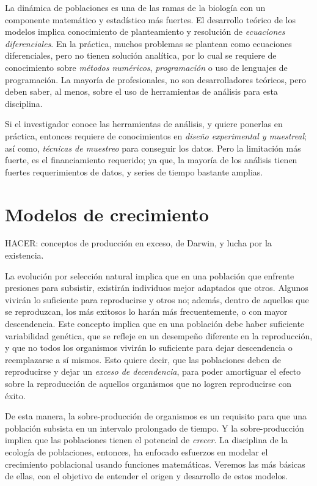 \documentclass[12pt,letterpaper,]{book}
\begin{document}
La dinámica de poblaciones es una de las ramas de la biología con un
componente matemático y estadístico más fuertes. El desarrollo teórico
de los modelos implica conocimiento de planteamiento y resolución de
\emph{ecuaciones diferenciales}. En la práctica, muchos problemas se
plantean como ecuaciones diferenciales, pero no tienen solución
analítica, por lo cual se requiere de conocimiento sobre \emph{métodos
numéricos}, \emph{programación} o uso de lenguajes de programación. La
mayoría de profesionales, no son desarrolladores teóricos, pero deben
saber, al menos, sobre el uso de herramientas de análisis para esta
disciplina.

Si el investigador conoce las herramientas de análisis, y quiere
ponerlas en práctica, entonces requiere de conocimientos en \emph{diseño
experimental y muestreal}; así como, \emph{técnicas de muestreo} para
conseguir los datos. Pero la limitación más fuerte, es el financiamiento
requerido; ya que, la mayoría de los análisis tienen fuertes
requerimientos de datos, y series de tiempo bastante amplias.

\chapter{Modelos de crecimiento}\label{modelos-de-crecimiento}

HACER: conceptos de producción en exceso, de Darwin, y lucha por la
existencia.

La evolución por selección natural implica que en una población que
enfrente presiones para subsistir, existirán individuos mejor adaptados
que otros. Algunos vivirán lo suficiente para reproducirse y otros no;
además, dentro de aquellos que se reproduzcan, los más exitosos lo harán
más frecuentemente, o con mayor descendencia. Este concepto implica que
en una población debe haber suficiente variabilidad genética, que se
refleje en un desempeño diferente en la reproducción, y que no todos los
organismos vivirán lo suficiente para dejar descendencia o reemplazarse
a sí mismos. Esto quiere decir, que las poblaciones deben de
reproducirse y dejar un \emph{exceso de decendencia}, para poder
amortiguar el efecto sobre la reproducción de aquellos organismos que no
logren reproducirse con éxito.

De esta manera, la sobre-producción de organismos es un requisito para
que una población subsista en un intervalo prolongado de tiempo. Y la
sobre-producción implica que las poblaciones tienen el potencial de
\emph{crecer}. La disciplina de la ecología de poblaciones, entonces, ha
enfocado esfuerzos en modelar el crecimiento poblacional usando
funciones matemáticas. Veremos las más básicas de ellas, con el objetivo
de entender el origen y desarrollo de estos modelos.
\end{document}
